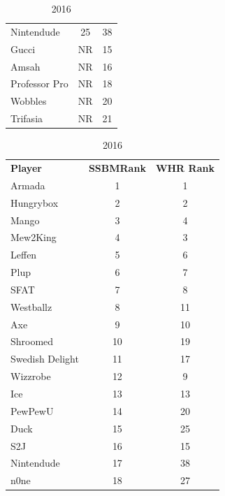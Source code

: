 \documentclass[10pt]{article}
\theoremstyle{definition}
\theoremstyle{remark}
\begin{document}
\begin{table}[!ht]
{\begin{tabular}{lcc}
    Nintendude      & 25                     & 38       \\
    Gucci           & NR                     & 15       \\
    Amsah           & NR                     & 16       \\
    Professor Pro   & NR                     & 18       \\
    Wobbles         & NR                     & 20       \\
    Trifasia        & NR                     & 21       \\
    \end{tabular}
    }
    \parbox{.3\textwidth}{
        \centering
    \caption{2016}
    \begin{tabular}{lcc}
    \textbf{Player} & \textbf{SSBMRank} & \textbf{WHR Rank} \\
    Armada          & 1                      & 1        \\
    Hungrybox       & 2                      & 2        \\
    Mango           & 3                      & 4        \\
    Mew2King        & 4                      & 3        \\
    Leffen          & 5                      & 6        \\
    Plup            & 6                      & 7        \\
    SFAT            & 7                      & 8        \\
    Westballz       & 8                      & 11       \\
    Axe             & 9                      & 10       \\
    Shroomed        & 10                     & 19       \\
    Swedish Delight & 11                     & 17       \\
    Wizzrobe        & 12                     & 9        \\
    Ice             & 13                     & 13       \\
    PewPewU         & 14                     & 20       \\
    Duck            & 15                     & 25       \\
    S2J             & 16                     & 15       \\
    Nintendude      & 17                     & 38       \\
    n0ne            & 18                     & 27       \\

\end{tabular}}
\end{table}
\end{document}
